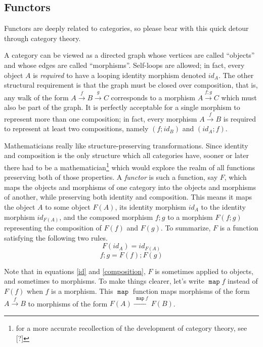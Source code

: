 \documentclass[proof]{article}
\newcommand{\map}{\ensuremath{\mathop{\mathtt{map}}}}
\begin{document}
\begin{multicols}{2}
\section{Functors}\label{functor}
\vspace{-\parskip}\hspace*{\parindent}Functors are deeply related to categories, so please bear with this quick detour through category theory.

A category can be viewed as a directed graph whose vertices are called ``objects'' and whose edges are called ``morphisms''. Self-loops are allowed; in fact, every object $A$ is \emph{required} to have a looping identity morphism denoted $id_A$. The other structural requirement is that the graph must be closed over composition, that is, any walk of the form $A \stackrel{f}{\longrightarrow} B \stackrel{g}{\longrightarrow} C$ corresponds to a morphism $A \stackrel{f;g}{\longrightarrow} C$ which must also be part of the graph. It is perfectly acceptable for a single morphism to represent more than one composition; in fact, every morphism $A \stackrel{f}{\longrightarrow} B$ is required to represent at least two compositions, namely $(f;id_B)$ and $(id_A;f)$.

Mathematicians really like structure-preserving transformations. Since identity and composition is the only structure which all categories have, sooner or later there had to be a mathematician\footnote{for a more accurate recollection of the development of category theory, see [?]} which would explore the realm of all functions preserving both of those properties. A \emph{functor} is such a function, say $F$, which maps the objects and morphisms of one category into the objects and morphisms of another, while preserving both identity and composition. This means it maps the object $A$ to some object $F(A)$, its identity morphism $id_A$ to the identity morphism $id_{F(A)}$, and the composed morphism $f;g$ to a morphism $F(f;g)$ representing the composition of $F(f)$ and $F(g)$. To summarize, $F$ is a function satisfying the following two rules.
\begin{equation}\label{id}
F(id_A) = id_{F(A)}
\end{equation}
\begin{equation}\label{composition}
f;g = F(f);F(g)
\end{equation}

Note that in equations \ref{id} and \ref{composition}, $F$ is sometimes applied to objects, and sometimes to morphisms. To make things clearer, let's write $\map f$ instead of $F(f)$ when $f$ is a morphism. This $\map$ function maps morphisms of the form $A \stackrel{f}{\longrightarrow} B$ to morphisms of the form $F(A) \xrightarrow{~\map f~} F(B)$.


\end{multicols}
\end{document}
